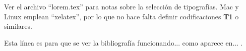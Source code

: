 
%


Ver el archivo \enquote{lorem.tex} para notas sobre la selección de tipografías. Mac y Linux emplean \enquote{xelatex}, por lo que no hace falta definir codificaciones \textbf{T1} o similares.

Esta línea es para que se ver la bibliografía funcionando... como aparece en... \cite{libro1}.

\blindtext[2]

\Blindtext

\Blindtext